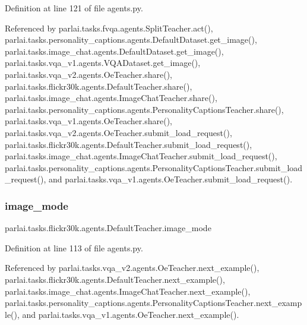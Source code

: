 Definition at line 121 of file agents.\+py.



Referenced by parlai.\+tasks.\+fvqa.\+agents.\+Split\+Teacher.\+act(), parlai.\+tasks.\+personality\+\_\+captions.\+agents.\+Default\+Dataset.\+get\+\_\+image(), parlai.\+tasks.\+image\+\_\+chat.\+agents.\+Default\+Dataset.\+get\+\_\+image(), parlai.\+tasks.\+vqa\+\_\+v1.\+agents.\+V\+Q\+A\+Dataset.\+get\+\_\+image(), parlai.\+tasks.\+vqa\+\_\+v2.\+agents.\+Oe\+Teacher.\+share(), parlai.\+tasks.\+flickr30k.\+agents.\+Default\+Teacher.\+share(), parlai.\+tasks.\+image\+\_\+chat.\+agents.\+Image\+Chat\+Teacher.\+share(), parlai.\+tasks.\+personality\+\_\+captions.\+agents.\+Personality\+Captions\+Teacher.\+share(), parlai.\+tasks.\+vqa\+\_\+v1.\+agents.\+Oe\+Teacher.\+share(), parlai.\+tasks.\+vqa\+\_\+v2.\+agents.\+Oe\+Teacher.\+submit\+\_\+load\+\_\+request(), parlai.\+tasks.\+flickr30k.\+agents.\+Default\+Teacher.\+submit\+\_\+load\+\_\+request(), parlai.\+tasks.\+image\+\_\+chat.\+agents.\+Image\+Chat\+Teacher.\+submit\+\_\+load\+\_\+request(), parlai.\+tasks.\+personality\+\_\+captions.\+agents.\+Personality\+Captions\+Teacher.\+submit\+\_\+load\+\_\+request(), and parlai.\+tasks.\+vqa\+\_\+v1.\+agents.\+Oe\+Teacher.\+submit\+\_\+load\+\_\+request().

\mbox{\label{classparlai_1_1tasks_1_1flickr30k_1_1agents_1_1DefaultTeacher_a9172db25337a0e2c2c8348c0f2d63d69}} 
\subsubsection{\texorpdfstring{image\+\_\+mode}{image\_mode}}
{\footnotesize\ttfamily parlai.\+tasks.\+flickr30k.\+agents.\+Default\+Teacher.\+image\+\_\+mode}



Definition at line 113 of file agents.\+py.



Referenced by parlai.\+tasks.\+vqa\+\_\+v2.\+agents.\+Oe\+Teacher.\+next\+\_\+example(), parlai.\+tasks.\+flickr30k.\+agents.\+Default\+Teacher.\+next\+\_\+example(), parlai.\+tasks.\+image\+\_\+chat.\+agents.\+Image\+Chat\+Teacher.\+next\+\_\+example(), parlai.\+tasks.\+personality\+\_\+captions.\+agents.\+Personality\+Captions\+Teacher.\+next\+\_\+example(), and parlai.\+tasks.\+vqa\+\_\+v1.\+agents.\+Oe\+Teacher.\+next\+\_\+example().

